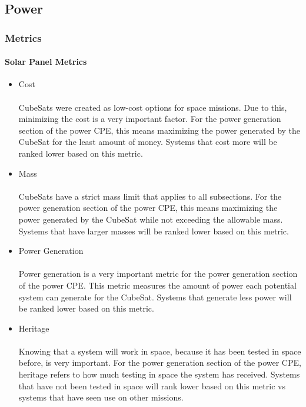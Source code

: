 
\subsection{Power}
\subsubsection{Metrics}
\paragraph{Solar Panel Metrics}
\begin{itemize}
\item Cost\\
\\
CubeSats were created as low-cost options for space missions.  Due to this, minimizing the cost is a very important factor.  For the power generation section of the power CPE,  this means maximizing the power generated by the CubeSat for the least amount of money.  Systems that cost more will be ranked lower based on this metric.
\item{Mass} \\
\\
CubeSats have a strict mass limit that applies to all subsections.  For the power generation section of the power CPE, this means maximizing the power generated by the CubeSat while not exceeding the allowable mass.  Systems that have larger masses will be ranked lower based on this metric.
\item{Power Generation} \\
\\
Power generation is a very important metric for the power generation section of the power CPE.  This metric measures the amount of power each potential system can generate for the CubeSat.  Systems that generate less power will be ranked lower based on this metric.
\item{Heritage} \\
\\
Knowing that a system will work in space, because it has been tested in space before, is very important. For the power generation section of the power CPE, heritage refers to how much testing in space the system has received.  Systems that have not been tested in space will rank lower based on this metric vs systems that have seen use on other missions.
\end{itemize}

